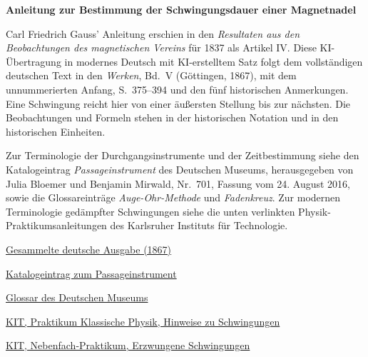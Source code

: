\clearpage
\thispagestyle{empty}
\begin{center}\Large\textbf{Anleitung zur Bestimmung der Schwingungsdauer einer Magnetnadel}\end{center}

Carl Friedrich Gauss’ Anleitung erschien in den \textit{Resultaten aus den Beobachtungen des magnetischen Vereins} für 1837 als Artikel IV. Diese KI-Übertragung in modernes Deutsch mit KI-erstelltem Satz folgt dem vollständigen deutschen Text in den \textit{Werken}, Bd.~V (Göttingen, 1867), mit dem unnummerierten Anfang, S.~375--394 und den fünf historischen Anmerkungen. Eine Schwingung reicht hier von einer äußersten Stellung bis zur nächsten. Die Beobachtungen und Formeln stehen in der historischen Notation und in den historischen Einheiten.

\smallskip\noindent
Zur Terminologie der Durchgangsinstrumente und der Zeitbestimmung siehe den Katalogeintrag \textit{Passageinstrument} des Deutschen Museums, herausgegeben von Julia Bloemer und Benjamin Mirwald, Nr.~701, Fassung vom 24. August 2016, sowie die Glossareinträge \textit{Auge-Ohr-Methode} und \textit{Fadenkreuz}. Zur modernen Terminologie gedämpfter Schwingungen siehe die unten verlinkten Physik-Praktikumsanleitungen des Karlsruher Instituts für Technologie.

\medskip\noindent
\href{https://gdz.sub.uni-goettingen.de/id/PPN236006339}{Gesammelte deutsche Ausgabe (1867)}\par
\noindent\href{https://digital.deutsches-museum.de/projekte/gruendungssammlung/detail/701/}{Katalogeintrag zum Passageinstrument}\par
\noindent\href{https://digital.deutsches-museum.de/projekte/gruendungssammlung/glossar/}{Glossar des Deutschen Museums}\par
\noindent\href{https://labs.physik.kit.edu/prakt-klass-physik-manuals/P1/Resonanz/doc/Hinweise-Schwingung/}{KIT, Praktikum Klassische Physik, Hinweise zu Schwingungen}\par
\noindent\href{https://labs.physik.kit.edu/prakt-nebenfach-manuals/Experiments/Erzwungene_Schwingungen/}{KIT, Nebenfach-Praktikum, Erzwungene Schwingungen}
\clearpage
